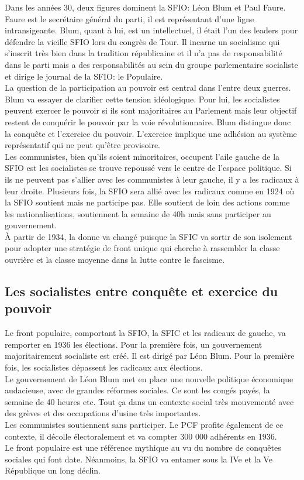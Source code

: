 \documentclass[10pt, a4paper, openany]{book}
\begin{document}
Dans les années 30, deux figures dominent la SFIO: Léon Blum et Paul Faure. Faure est le secrétaire général du parti, il est représentant d'une ligne intransigeante. Blum, quant à lui, est un intellectuel, il était l'un des leaders pour défendre la vieille SFIO lors du congrès de Tour. Il incarne un socialisme qui s'inscrit très bien dans la tradition républicaine et il n'a pas de responsabilité dans le parti mais a des responsabilités au sein du groupe parlementaire socialiste et dirige le journal de la SFIO: le Populaire. \\
La question de la participation au pouvoir est central dans l'entre deux guerres. Blum va essayer de clarifier cette tension idéologique. Pour lui, les socialistes peuvent exercer le pouvoir si ils sont majoritaires au Parlement mais leur objectif restent de conquérir le pouvoir par la voie révolutionnaire. Blum distingue donc la conquête et l'exercice du pouvoir. L'exercice implique une adhésion au système représentatif qui ne peut qu'être provisoire. \\
Les communistes, bien qu'ils soient minoritaires, occupent l'aile gauche de la SFIO est les socialistes se trouve repoussé vers le centre de l'espace politique. Si ils ne peuvent pas s'allier avec les communistes à leur gauche, il y a les radicaux à leur droite. Plusieurs fois, la SFIO sera allié avec les radicaux comme en 1924 où la SFIO soutient mais ne participe pas. Elle soutient de loin des actions comme les nationalisations, soutiennent la semaine de 40h mais sans participer au gouvernement. \\
À partir de 1934, la donne va changé puisque la SFIC va sortir de son isolement pour adopter une stratégie de front unique qui cherche à rassembler la classe ouvrière et la classe moyenne dans la lutte contre le fascisme. 








\subsection{Les socialistes entre conquête et exercice du pouvoir}

Le front populaire, comportant la SFIO, la SFIC et les radicaux de gauche, va remporter en 1936 les élections. Pour la première fois, un gouvernement majoritairement socialiste est créé. Il est dirigé par Léon Blum. Pour la première fois, les socialistes dépassent les radicaux aux élections. \\
Le gouvernement de Léon Blum met en place une nouvelle politique économique audacieuse, avec de grandes réformes sociales. Ce sont les congés payés, la semaine de 40 heures etc. Tout ça dans un contexte social très mouvementé avec des grèves et des occupations d'usine très importantes. \\
Les communistes soutiennent sans participer. Le PCF profite également de ce contexte, il décolle électoralement et va compter 300 000 adhérents en 1936. \\
Le front populaire est une référence mythique au vu du nombre de conquêtes sociales qui font date. Néanmoins, la SFIO va entamer sous la IVe et la Ve République un long déclin.
\end{document}
